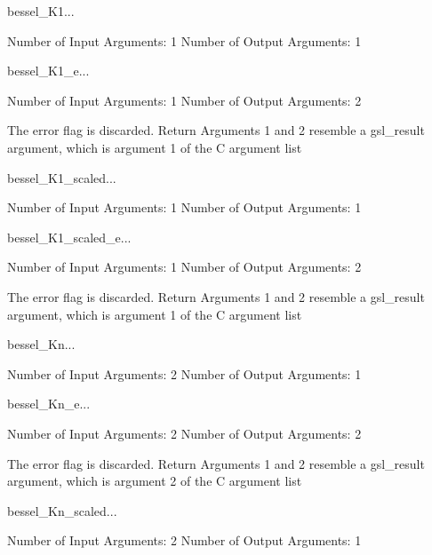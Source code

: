 \begin{funcdesc}{bessel_K1}{...}

    Number of Input  Arguments:  1
    Number of Output Arguments:  1
\end{funcdesc}

\begin{funcdesc}{bessel_K1_e}{...}

    Number of Input  Arguments:  1
    Number of Output Arguments:  2

The error flag is discarded.
Return Arguments 1 and 2 resemble a gsl_result argument,
	which is  argument 1 of the C argument list

\end{funcdesc}

\begin{funcdesc}{bessel_K1_scaled}{...}

    Number of Input  Arguments:  1
    Number of Output Arguments:  1
\end{funcdesc}

\begin{funcdesc}{bessel_K1_scaled_e}{...}

    Number of Input  Arguments:  1
    Number of Output Arguments:  2

The error flag is discarded.
Return Arguments 1 and 2 resemble a gsl_result argument,
	which is  argument 1 of the C argument list

\end{funcdesc}

\begin{funcdesc}{bessel_Kn}{...}

    Number of Input  Arguments:  2
    Number of Output Arguments:  1
\end{funcdesc}

\begin{funcdesc}{bessel_Kn_e}{...}

    Number of Input  Arguments:  2
    Number of Output Arguments:  2

The error flag is discarded.
Return Arguments 1 and 2 resemble a gsl_result argument,
	which is  argument 2 of the C argument list

\end{funcdesc}

\begin{funcdesc}{bessel_Kn_scaled}{...}

    Number of Input  Arguments:  2
    Number of Output Arguments:  1
\end{funcdesc}

